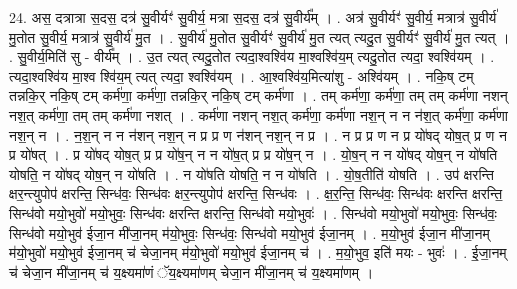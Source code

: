 \documentclass[17pt]{extarticle}
\begin{document}
24. अस॒ दत्रात्रा स॒दस॒ दत्र॑ सु॒वीर्यꣳ॑ सु॒वीर्य॒ मत्रा स॒दस॒ दत्र॑ सु॒वीर्य᳚म् । . अत्र॑ सु॒वीर्यꣳ॑ सु॒वीर्य॒ मत्रात्र॑ सु॒वीर्य॑ मु॒तोत सु॒वीर्य॒ मत्रात्र॑ सु॒वीर्य॑ मु॒त । . सु॒वीर्य॑ मु॒तोत सु॒वीर्यꣳ॑ सु॒वीर्य॑ मु॒त त्यत् त्यदु॒त सु॒वीर्यꣳ॑ सु॒वीर्य॑ मु॒त त्यत् । . सु॒वीर्य॒मिति॑ सु - वीर्य᳚म् । . उ॒त त्यत् त्यदु॒तोत त्यदा॒श्वश्वि॑य मा॒श्वश्वि॑य॒म् त्यदु॒तोत त्यदा॒ श्वश्वि॑यम् । . त्यदा॒श्वश्वि॑य मा॒श्व श्वि॑य॒म् त्यत् त्यदा॒ श्वश्वि॑यम् । . आ॒श्वश्वि॑य॒मित्या॑शु - अश्वि॑यम् । . नकि॒ष् टम् तन्नकि॒र् नकि॒ष् टम् कर्म॑णा॒ कर्म॑णा॒ तन्नकि॒र् नकि॒ष् टम् कर्म॑णा । . तम् कर्म॑णा॒ कर्म॑णा॒ तम् तम् कर्म॑णा नशन् नश॒त् कर्म॑णा॒ तम् तम् कर्म॑णा नशत् । . कर्म॑णा नशन् नश॒त् कर्म॑णा॒ कर्म॑णा नश॒न् न न न॑श॒त् कर्म॑णा॒ कर्म॑णा नश॒न् न । . न॒श॒न् न न न॑शन् नश॒न् न प्र प्र ण न॑शन् नश॒न् न प्र । . न प्र प्र ण न प्र यो॑षद् योष॒त् प्र ण न प्र यो॑षत् । . प्र यो॑षद् योष॒त् प्र प्र यो॑ष॒न् न न यो॑ष॒त् प्र प्र यो॑ष॒न् न । . यो॒ष॒न् न न यो॑षद् योष॒न् न यो॑षति योषति॒ न यो॑षद् योष॒न् न यो॑षति । . न यो॑षति योषति॒ न न यो॑षति । . यो॒ष॒तीति॑ योषति । . उप॑ क्षरन्ति क्षर॒न्त्युपोप॑ क्षरन्ति॒ सिन्ध॑वः॒ सिन्ध॑वः क्षर॒न्त्युपोप॑ क्षरन्ति॒ सिन्ध॑वः । . क्ष॒र॒न्ति॒ सिन्ध॑वः॒ सिन्ध॑वः क्षरन्ति क्षरन्ति॒ सिन्ध॑वो मयो॒भुवो॑ मयो॒भुवः॒ सिन्ध॑वः क्षरन्ति क्षरन्ति॒ सिन्ध॑वो मयो॒भुवः॑ । . सिन्ध॑वो मयो॒भुवो॑ मयो॒भुवः॒ सिन्ध॑वः॒ सिन्ध॑वो मयो॒भुव॑ ईजा॒न मी॑जा॒नम् म॑यो॒भुवः॒ सिन्ध॑वः॒ सिन्ध॑वो मयो॒भुव॑ ईजा॒नम् । . म॒यो॒भुव॑ ईजा॒न मी॑जा॒नम् म॑यो॒भुवो॑ मयो॒भुव॑ ईजा॒नम् च॑ चेजा॒नम् म॑यो॒भुवो॑ मयो॒भुव॑ ईजा॒नम् च॑ । . म॒यो॒भुव॒ इति॑ मयः - भुवः॑ । . ई॒जा॒नम् च॑ चेजा॒न मी॑जा॒नम् च॑ य॒क्ष्यमा॑णं ॅय॒क्ष्यमा॑णम् चेजा॒न मी॑जा॒नम् च॑ य॒क्ष्यमा॑णम् । \newline
\end{document}

